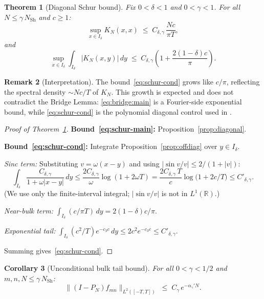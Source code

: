 \documentclass[12pt,a4paper]{article}
\newtheorem{theorem}{Theorem}[section]
\newtheorem{corollary}[theorem]{Corollary}
\theoremstyle{definition}
\newtheorem{remark}[theorem]{Remark}
\newcommand{\NSh}{N_{\mathrm{Sh}}}
\begin{document}
\begin{theorem}[Diagonal Schur bound]
\label{thm:schur-main}
Fix $0 < \delta < 1$ and $0 < \gamma < 1$.
For all $N \le \gamma\,\NSh$ and $c \ge 1$:
\begin{equation}
\label{eq:schur-main}
  \sup_{x \in I_\delta} K_N(x,x)
  \;\le\; C_{\delta,\gamma}\,\frac{Nc}{\pi T},
\end{equation}
and
\begin{equation}
\label{eq:schur-cond}
  \sup_{x \in I_\delta}
  \int_{I_\delta}|K_N(x,y)|\,dy
  \;\le\;
  C_{\delta,\gamma}
  \!\left(1 + \frac{2(1-\delta)c}{\pi}\right).
\end{equation}
\end{theorem}

\begin{remark}[Interpretation]
\label{rem:schur-interp}
The bound~\eqref{eq:schur-cond} grows like $c/\pi$,
reflecting the spectral density $\sim Nc/T$ of $K_N$.
This growth is expected and does not contradict the
Bridge Lemma: \eqref{eq:bridge:main} is a Fourier-side
exponential bound, while \eqref{eq:schur-cond} is the
polynomial diagonal control used in
\cite[Theorem~3.2]{PaperIII}.
\end{remark}

\begin{proof}[Proof of Theorem~\ref{thm:schur-main}]
\textbf{Bound~\eqref{eq:schur-main}:}
Proposition~\ref{prop:diagonal}.

\textbf{Bound~\eqref{eq:schur-cond}:}
Integrate Proposition~\ref{prop:offdiag} over
$y \in I_\delta$.

\textit{Sinc term:} Substituting $v = \omega(x-y)$
and using $|\sin v/v| \le 2/(1+|v|)$:
\[
  \int_{I_\delta}
  \frac{C_{\delta,\gamma}}{1+\omega|x-y|}\,dy
  \le \frac{2C_{\delta,\gamma}}{\omega}
      \log(1+2\omega T)
  = \frac{2C_{\delta,\gamma}\,T}{c}
    \log\!\bigl(1+2c/T\bigr)
  \le C'_{\delta,\gamma}.
\]
(We use only the finite-interval integral;
$|\sin v/v|$ is not in $L^1(\mathbb{R})$.)

\textit{Near-bulk term:}
$\int_{I_\delta}(c/\pi T)\,dy
= 2(1-\delta)c/\pi$.

\textit{Exponential tail:}
$\int_{I_\delta}(c^2/T)e^{-c_3 c}\,dy
\le 2c^2 e^{-c_3 c} \le C'_{\delta,\gamma}$.

Summing gives~\eqref{eq:schur-cond}.
\end{proof}

\begin{corollary}[Unconditional bulk tail bound]
\label{cor:bulk-final}
For all $0 < \gamma < 1/2$ and
$m,n,N \le \gamma\,\NSh$:
\[
  \|(I - P_N)f_{mn}\|_{L^2([-T,T])}
  \;\le\; C_\gamma\,e^{-\alpha_\gamma' N}.
\]
\end{corollary}
\end{document}

